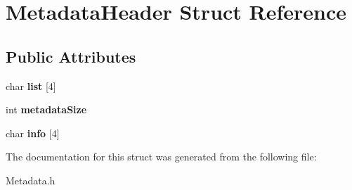 \hypertarget{structMetadataHeader}{}\section{Metadata\+Header Struct Reference}
\label{structMetadataHeader}
\subsection*{Public Attributes}
\begin{DoxyCompactItemize}
\item 
\mbox{\label{structMetadataHeader_a10b36c8cdba5d2313d92efb248690512}} 
char {\bfseries list} \mbox{[}4\mbox{]}
\item 
\mbox{\label{structMetadataHeader_a4e28b8fa9faa5d41fe750840e7c49ff9}} 
int {\bfseries metadata\+Size}
\item 
\mbox{\label{structMetadataHeader_a4cad7a9ff9f30bdd5b3ecdf2089f0193}} 
char {\bfseries info} \mbox{[}4\mbox{]}
\end{DoxyCompactItemize}


The documentation for this struct was generated from the following file\+:\begin{DoxyCompactItemize}
\item 
Metadata.\+h\end{DoxyCompactItemize}

